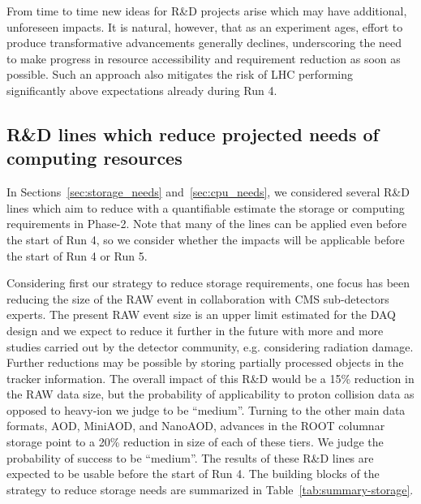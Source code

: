 \documentclass{cmspaper}
\begin{document}
From time to time new ideas for R\&D projects arise which may have additional, unforeseen impacts. It is natural, however, that as an experiment ages, effort to produce transformative advancements generally declines, underscoring the need to make progress in resource accessibility and requirement reduction as soon as possible. Such an approach also mitigates the risk of LHC performing significantly above expectations already during Run 4.

\subsection{R\&D lines which reduce projected needs of computing resources}
\label{sec:lines_which_reduce}

In Sections~\ref{sec:storage_needs} and~\ref{sec:cpu_needs}, we considered several R\&D lines which aim to reduce with a quantifiable estimate the storage or computing requirements in Phase-2. Note that many of the lines can be applied even before the start of Run 4, so we consider whether the impacts will be applicable before the start of Run 4 or Run 5.

Considering first our strategy to reduce storage requirements, one focus has been reducing the size of the RAW event in collaboration with CMS sub-detectors experts. The present RAW event size is an upper limit estimated for the DAQ design and we expect to reduce it further in the future with more and more studies carried out by the detector community, e.g. considering radiation damage. Further reductions may be possible by storing partially processed objects in the tracker information. The overall impact of this R\&D would be a 15\% reduction in the RAW data size, but the probability of applicability to proton collision data as opposed to heavy-ion we judge to be ``medium''. Turning to the other main data formats, AOD, MiniAOD, and NanoAOD, advances in the ROOT columnar storage point to a 20\% reduction in size of each of these tiers. We judge the probability of success to be ``medium''. The results of these R\&D lines are expected to be usable before the start of Run 4. The building blocks of the strategy to reduce storage needs are summarized in Table~\ref{tab:summary-storage}. 
\end{document}
